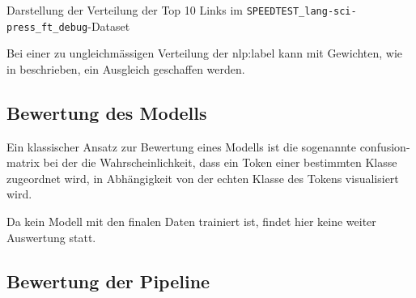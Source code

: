 \begin{figure}
	\begin{adjustbox}{center,max width=0.9\linewidth,max totalheight=0.9\textheight}
		\begin{tcolorbox}
			
		\end{tcolorbox}
	\end{adjustbox}
\end{figure}
\caption{Darstellung der Verteilung der Top 10 Links im \texttt{SPEEDTEST\_lang-sci-press\_ft\_debug}-Dataset}


\citeauthor{1906.01378}
Bei einer zu ungleichmässigen Verteilung der \gls{nlp:label} kann mit Gewichten,
wie in \autocite[Loss Definition]{1906.01378} beschrieben,
ein Ausgleich geschaffen werden.



\subsection{Bewertung des Modells}

Ein klassischer Ansatz zur Bewertung eines Modells ist die sogenannte \gls{confusion-matrix}
bei der die Wahrscheinlichkeit,
dass ein Token einer bestimmten Klasse zugeordnet wird,
in Abhängigkeit von der echten Klasse des Tokens visualisiert wird.

Da kein Modell mit den finalen Daten trainiert ist,
findet hier keine weiter Auswertung statt.

\subsection{Bewertung der Pipeline}
